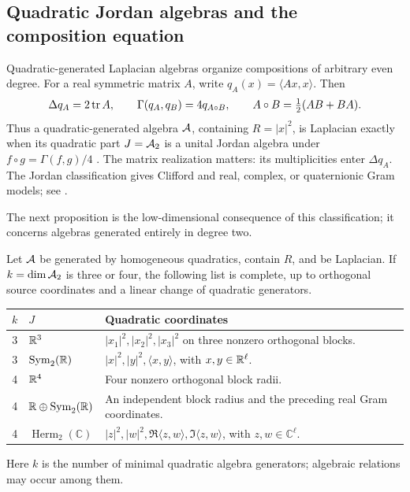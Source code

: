 \subsection{Quadratic Jordan algebras and the composition equation}
\label{sec:quadratic-jordan-framework}

Quadratic-generated Laplacian algebras organize compositions of
arbitrary even degree. For a real symmetric matrix $A$, write
$q_A(x)=\langle Ax,x\rangle$.
Then
\begin{equation}\label{eq:quadratic-jordan-correspondence}
 \Delta q_A=2\operatorname{tr} A,\qquad
 \Gamma(q_A,q_B)=4q_{A\circ B},\qquad
 A\circ B=\tfrac12(AB+BA).
\end{equation}
Thus a quadratic-generated algebra $\mathcal A$, containing $R=|x|^2$,
is Laplacian exactly when its quadratic part $J=\mathcal A_2$ is a unital
Jordan algebra under $f\circ g=\Gamma(f,g)/4$
\cite[Proposition~37(b)]{MendesRadeschi}. The matrix realization matters: its multiplicities enter $\Delta q_A$.
The Jordan classification gives Clifford and real, complex, or
quaternionic Gram models; see
\cite[Theorems~B--C, Section~3 and Appendix~A]{MendesRadeschiQuadratic}.

The next proposition is the low-dimensional consequence of this
classification; it concerns algebras generated entirely in degree two.

\begin{proposition}
\label{prop:three-quadratic-normal-forms}
\label{prop:low-dimensional-quadratic-jordan}
Let $\mathcal A$ be generated by homogeneous quadratics, contain $R$, and
be Laplacian. If $k=\dim\mathcal A_2$ is three or four, the following
list is complete, up to orthogonal source coordinates and a linear
change of quadratic generators.
\begin{center}
\small
\begin{tabular}{cl>{\raggedright\arraybackslash}p{}}
\toprule
$k$ & $J$ & Quadratic coordinates \\
\midrule
3 & $\mathbb R^3$ & $|x_1|^2,|x_2|^2,|x_3|^2$ on three nonzero orthogonal blocks. \\
3 & $\operatorname{Sym}_2(\mathbb R)$ & $|x|^2,|y|^2,\langle x,y\rangle$, with $x,y\in\mathbb R^\ell$. \\
4 & $\mathbb R^4$ & Four nonzero orthogonal block radii. \\
4 & $\mathbb R\oplus\operatorname{Sym}_2(\mathbb R)$ & An independent block radius and the preceding real Gram coordinates. \\
4 & $\operatorname{Herm}_2(\mathbb C)$ & $|z|^2,|w|^2,\Re\langle z,w\rangle,\Im\langle z,w\rangle$, with $z,w\in\mathbb C^\ell$. \\
\bottomrule
\end{tabular}
\end{center}
Here $k$ is the number of minimal quadratic algebra generators;
algebraic relations may occur among them.
\end{proposition}

